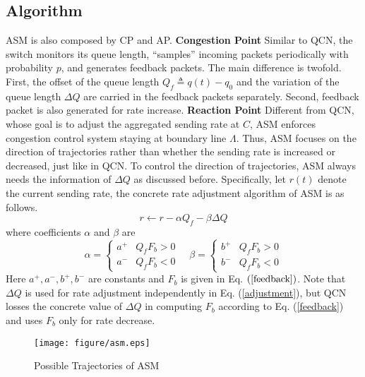 \documentclass{sig-alternate-10pt}
\begin{document}
\subsection{Algorithm}
ASM is also composed by CP and AP. \newline
\textbf{Congestion Point} Similar to QCN, the switch monitors its queue length, ``samples'' incoming packets periodically with probability $p$, and generates feedback packets. The main difference is twofold. First, the offset of the queue length $Q_f\triangleq q(t)-q_0$ and the variation of the queue length $\Delta Q$ are carried in the feedback packets separately. Second, feedback packet is also generated for rate increase. \newline
\textbf{Reaction Point} 
Different from QCN, whose goal is to adjust the aggregated sending rate at $C$, ASM enforces congestion control system staying at boundary line $\Lambda$. Thus, ASM focuses on the direction of trajectories rather than whether the sending rate is increased or decreased, just like in QCN. To control the direction of trajectories, ASM always needs the information of $\Delta Q$ as discussed before. Specifically, let $r(t)$ denote the current sending rate, the concrete rate adjustment algorithm of ASM is as follows.
\begin{equation}
r\leftarrow r-\alpha Q_f-\beta\Delta Q
\label{adjustment}
\end{equation}
where coefficients $\alpha$ and $\beta$ are
\begin{equation}
\alpha=\left \{ \begin{array}{ll}
a^+ &  Q_fF_b> 0  \\
a^- &  Q_fF_b< 0
\end{array}
\right.
\quad
\beta=\left \{ \begin{array}{ll}
b^+ & Q_fF_b> 0  \\
b^- & Q_fF_b< 0
\end{array}
\right.
\label{coefficients}
\end{equation}
Here $a^+, a^-, b^+, b^-$ are constants and $F_b$ is given in Eq. $(\ref{feedback})$. Note that $\Delta Q$ is used for rate adjustment independently in Eq. (\ref{adjustment}), but QCN losses the concrete value of $\Delta Q$ in computing $F_b$ according to Eq. (\ref{feedback}) and uses $F_b$ only for rate decrease. 


\begin{figure}
\centering
\texttt{[image: figure/asm.eps]}
\caption{Possible Trajectories of ASM}
\label{asm-trajectory}
\end{figure}
\end{document}
